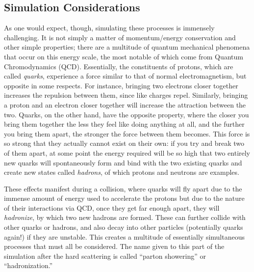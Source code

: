 \subsection{Simulation Considerations}\label{sec:Sim-Considerations}

As one would expect, though, simulating these processes is immensely challenging. It is not simply a matter of momentum/energy conservation and other simple properties; there are a multitude of quantum mechanical phenomena that occur on this energy scale, the most notable of which come from Quantum Chromodynamics (QCD). Essentially, the constituents of protons, which are called \textit{quarks}, experience a force similar to that of normal electromagnetism, but opposite in some respects. For instance, bringing two electrons closer together increases the repulsion between them, since like charges repel. Similarly, bringing a proton and an electron closer together will increase the attraction between the two. Quarks, on the other hand, have the opposite property, where the closer you bring them together the less they feel like doing anything at all, and the further you bring them apart, the stronger the force between them becomes. This force is so strong that they actually cannot exist on their own: if you try and break two of them apart, at some point the energy required will be so high that two entirely new quarks will spontaneously form and bind with the two existing quarks and create new states called \textit{hadrons}, of which protons and neutrons are examples.

These effects manifest during a collision, where quarks will fly apart due to the immense amount of energy used to accelerate the protons but due to the nature of their interactions via QCD, once they get far enough apart, they will \textit{hadronize}, by which two new hadrons are formed. These can further collide with other quarks or hadrons, and also decay into other particles (potentially quarks again!) if they are unstable. This creates a multitude of essentially simultaneous processes that must all be considered. The name given to this part of the simulation after the hard scattering is called ``parton showering'' or ``hadronization.''

